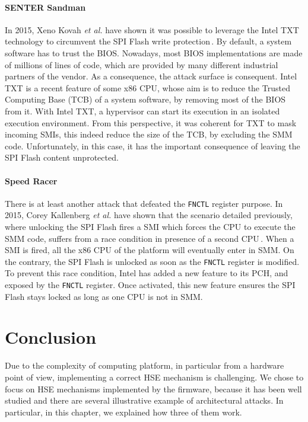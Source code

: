 \paragraph{SENTER Sandman}
%
In 2015, Xeno Kovah \emph{et al.} have shown it was possible to leverage the
Intel TXT technology to circumvent the SPI Flash write
protection\,\cite{kovah2015senter}.
%
By default, a system software has to trust the BIOS.
%
Nowadays, most BIOS implementations are made of millions of lines of code, which
are provided by many different industrial partners of the vendor.
%
As a consequence, the attack surface is consequent.
%
Intel TXT is a recent feature of some x86 CPU, whose aim is to reduce the
Trusted Computing Base (TCB) of a system software, by removing most of the BIOS
from it.
%
With Intel TXT, a hypervisor can start its execution in an isolated execution
environment.
%
From this perspective, it was coherent for TXT to mask incoming SMIs, this
indeed reduce the size of the TCB, by excluding the SMM code.
%
Unfortunately, in this case, it has the important consequence of leaving the SPI
Flash content unprotected.

\paragraph{Speed Racer}
%
There is at least another attack that defeated the \texttt{FNCTL} register
purpose.
%
In 2015, Corey Kallenberg \emph{et al.} have shown that the scenario detailed
previously, where unlocking the SPI Flash fires a SMI which forces the CPU to
execute the SMM code, suffers from a race condition in presence of a second
CPU\,\cite{kallenberg2015racecondition}.
%
When a SMI is fired, all the x86 CPU of the platform will eventually enter in
SMM.
%
On the contrary, the SPI Flash is unlocked as soon as the \texttt{FNCTL}
register is modified.
%
To prevent this race condition, Intel has added a new feature to its PCH, and
exposed by the \texttt{FNCTL} register.
%
Once activated, this new feature ensures the SPI Flash stays locked as long as
one CPU is not in SMM.

\section{Conclusion}
\label{sec:usecase:conclusion}

Due to the complexity of computing platform, in particular from a hardware point
of view, implementing a correct HSE mechanism is challenging.
%
We chose to focus on HSE mechanisms implemented by the firmware, because it has
been well studied and there are several illustrative example of architectural
attacks.
%
In particular, in this chapter, we explained how three of them work.
